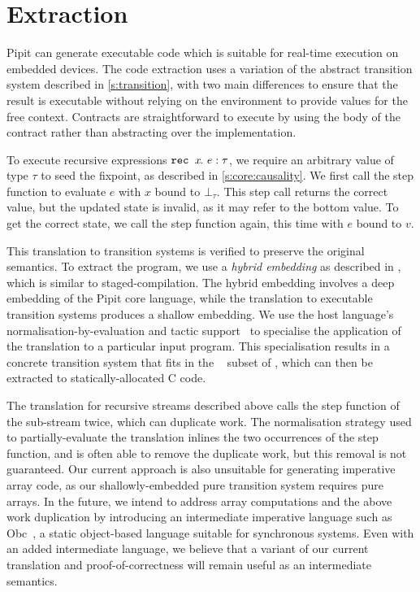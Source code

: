 

\section{Extraction}
\label{s:extraction}

Pipit can generate executable code which is suitable for real-time execution on embedded devices.
The code extraction uses a variation of the abstract transition system described in \autoref{s:transition}, with two main differences to ensure that the result is executable without relying on the environment to provide values for the free context.
Contracts are straightforward to execute by using the body of the contract rather than abstracting over the implementation.

To execute recursive expressions $\texttt{rec~} x\hspace{-0.1em}.~e : \tau$, we require an arbitrary value of type $\tau$ to seed the fixpoint, as described in \autoref{s:core:causality}.
We first call the step function to evaluate $e$ with $x$ bound to $\bot_\tau$.
This step call returns the correct value, but the updated state is invalid, as it may refer to the bottom value.
To get the correct state, we call the step function again, this time with $e$ bound to $v$.

This translation to transition systems is verified to preserve the original semantics.
To extract the program, we use a \emph{hybrid embedding} as described in \cite{ho2022noise}, which is similar to staged-compilation.
The hybrid embedding involves a deep embedding of the Pipit core language, while the translation to executable transition systems produces a shallow embedding.
We use the \fstar{} host language's normalisation-by-evaluation and tactic support~\cite{martinez2019meta} to specialise the application of the translation to a particular input program.
This specialisation results in a concrete transition system that fits in the \lowstar{}~\cite{protzenko2017verified} subset of \fstar{}, which can then be extracted to statically-allocated C code.

The translation for recursive streams described above calls the step function of the sub-stream twice, which can duplicate work.
The normalisation strategy used to partially-evaluate the translation inlines the two occurrences of the step function, and is often able to remove the duplicate work, but this removal is not guaranteed.
Our current approach is also unsuitable for generating imperative array code, as our shallowly-embedded pure transition system requires pure arrays.
In the future, we intend to address array computations and the above work duplication by introducing an intermediate imperative language such as Obc~\cite{biernacki2008clock}, a static object-based language suitable for synchronous systems.
Even with an added intermediate language, we believe that a variant of our current translation and proof-of-correctness will remain useful as an intermediate semantics.
